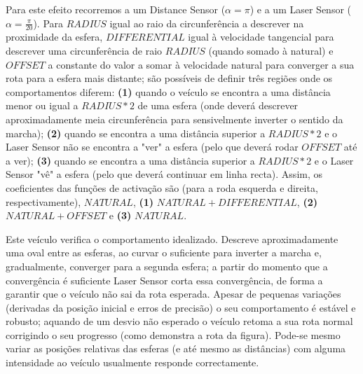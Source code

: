 \documentclass[a4paper]{article}
\begin{document}
Para este efeito recorremos a um Distance Sensor ($\alpha = \pi$) e a um Laser Sensor ($\alpha = \frac{\pi}{20}$).
Para $RADIUS$ igual ao raio da circunferência a descrever na proximidade da esfera, $DIFFERENTIAL$ igual à velocidade tangencial para descrever uma circunferência de raio $RADIUS$ (quando somado à natural) e $OFFSET$ a constante do valor a somar à velocidade natural para converger a sua rota para a esfera mais distante; são possíveis de definir três regiões onde os comportamentos diferem: \textbf{(1)} quando o veículo se encontra a uma distância menor ou igual a $RADIUS * 2$ de uma esfera (onde deverá descrever aproximadamente meia circunferência para sensivelmente inverter o sentido da marcha); \textbf{(2)} quando se encontra a uma distância superior a $RADIUS * 2$ e o Laser Sensor não se encontra a "ver" a esfera (pelo que deverá rodar $OFFSET$ até a ver); \textbf{(3)} quando se encontra a uma distância superior a $RADIUS * 2$ e o Laser Sensor "vê" a esfera (pelo que deverá continuar em linha recta). Assim, os coeficientes das funções de activação são (para a roda esquerda e direita, respectivamente), $NATURAL$, \textbf{(1)} $NATURAL + DIFFERENTIAL$, \textbf{(2)} $NATURAL + OFFSET$ e \textbf{(3)} $NATURAL$.

Este veículo verifica o comportamento idealizado. Descreve aproximadamente uma oval entre as esferas, ao curvar o suficiente para inverter a marcha e, gradualmente, converger para a segunda esfera; a partir do momento que a convergência é suficiente Laser Sensor corta essa convergência, de forma a garantir que o veículo não sai da rota esperada. Apesar de pequenas variações (derivadas da posição inicial e erros de precisão) o seu comportamento é estável e robusto; aquando de um desvio não esperado o veículo retoma a sua rota normal corrigindo o seu progresso (como demonstra a rota da figura). Pode-se mesmo variar as posições relativas das esferas (e até mesmo as distâncias) com alguma intensidade ao veículo usualmente responde correctamente.

\cleardoublepage
\end{document}
